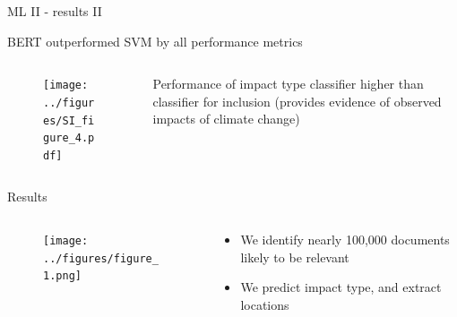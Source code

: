 \documentclass[9pt]{beamer}
\begin{document}
\begin{frame}{ML II - results II}

BERT outperformed SVM by all performance metrics

\begin{columns}
	\begin{column}{0.618\linewidth}
		\begin{figure}
			\texttt{[image: ../figures/SI\_figure\_4.pdf]}
		\end{figure}
	\end{column}
	
	\begin{column}{0.382\linewidth}
			Performance of impact type classifier higher than classifier for inclusion (provides evidence of observed impacts of climate change)
	\end{column}
\end{columns}



\end{frame}

\begin{frame}{Results}

\begin{columns}
	\begin{column}{0.618\linewidth}
		\begin{figure}
			\texttt{[image: ../figures/figure\_1.png]}
		\end{figure}
	\end{column}
	\begin{column}{0.382\linewidth}
		\begin{itemize}
			\item We identify nearly 100,000 documents likely to be relevant
			\item We predict impact type, and extract locations
		\end{itemize}
	
	\end{column}
\end{columns}

\end{frame}

\end{document}

